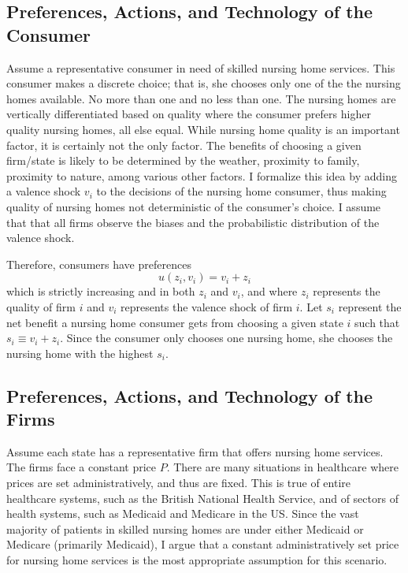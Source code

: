 \documentclass[../Main.tex]{subfiles}
\begin{document}
\subsection{Preferences, Actions, and Technology of the Consumer}
Assume a representative consumer in need of skilled nursing home services. This consumer makes a discrete choice; that is, she chooses only one of the the nursing homes available. No more than one and no less than one. The nursing homes are vertically differentiated based on quality where the consumer prefers higher quality nursing homes, all else equal. While nursing home quality is an important factor, it is certainly not the only factor. The benefits of choosing a given firm/state is likely to be determined by the weather, proximity to family, proximity to nature, among various other factors. I formalize this idea by adding a valence shock $v_i$ to the decisions of the nursing home consumer, thus making quality of nursing homes not deterministic of the consumer's choice. I assume that that all firms observe the biases and the probabilistic distribution of the valence shock. 

Therefore, consumers have preferences $$u(z_i,v_i) = v_i + z_i $$ which is strictly increasing and in both $z_i$ and $v_i$, and where $z_i$ represents the quality of firm $i$ and $v_i$ represents the valence shock of firm $i$. Let $s_i$ represent the net benefit a nursing home consumer gets from choosing a given state $i$ such that $s_i \equiv v_i + z_i$. Since the consumer only chooses one nursing home, she chooses the nursing home with the highest $s_i$.

\subsection{Preferences, Actions, and Technology of the Firms}
Assume each state has a representative firm that offers nursing home services. The firms face a constant price $P$. There are many situations in healthcare where prices are set administratively, and thus are fixed. This is true of entire healthcare systems, such as the British National Health Service, and of sectors of health systems, such as Medicaid and Medicare in the US. Since the vast majority of patients in skilled nursing homes are under either Medicaid or Medicare (primarily Medicaid), I argue that a constant administratively set price for nursing home services is the most appropriate assumption for this scenario.
\end{document}
